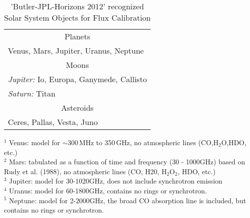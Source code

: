 \vspace{5mm}
\begin{table}[h!]
\caption{'Butler-JPL-Horizons 2012' recognized Solar System Objects for Flux Calibration
        {\label{table:fluxcal-table-solarsystem}}}
\begin{center}
\begin{tabular}{|l|} \hline
\hline
\multicolumn{1}{|c|}{Planets} \\

Venus\footnotemark[1], Mars\footnotemark[2], Jupiter\footnotemark[3], Uranus\footnotemark[4], Neptune\footnotemark[5]\\
\hline
\multicolumn{1}{|c|}{Moons}\\
{\it Jupiter:}  Io, Europa, Ganymede, Callisto\\
{\it Saturn:}  Titan\footnotemark[7] \\
\hline
\multicolumn{1}{|c|}{Asteroids}\\
Ceres, Pallas\footnotemark[8], Vesta\footnotemark[8],
Juno\footnotemark[8]\\
\hline
\end{tabular}
\end{center}
\footnotesize
$^1$ Venus: model for $\sim300$\,MHz to 350\,GHz, no atmospheric lines
(CO,H$_2$O,HDO, etc.)\\
$^2$ Mars: tabulated as a function of time and frequency (30 - 1000GHz) based on 
               Rudy et al. (1988), no atmospheric lines (CO, H20, H$_2$O$_2$, HDO, etc.)\\
$^3$ Jupiter: model for 30-1020GHz, does not include synchrotron
emission\\
$^4$ Uranus: model for 60-1800GHz, contains no rings or synchrotron.\\
$^5$ Neptune: model for 2-2000GHz, the broad CO absorption line
               is included, but contains no rings or synchrotron. \\


\end{table}
